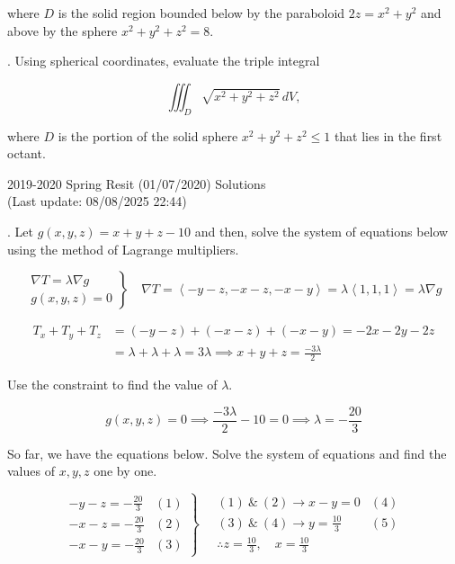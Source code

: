 \documentclass{article}
\begin{document}
\hfill

\noindent where $D$ is the solid region bounded below by the paraboloid $2z=x^2+y^2$ and above by the sphere $x^2+y^2+z^2=8$.

\hfill

. Using spherical coordinates, evaluate the triple integral

\[\iiint_D\sqrt{x^2+y^2+z^2}\,dV,\]

\hfill

\noindent where $D$ is the portion of the solid sphere $x^2+y^2+z^2\leq1$ that lies in the first octant.

\newpage

\begin{center}
2019-2020 Spring Resit (01/07/2020) Solutions\\
(Last update: 08/08/2025 22:44)
\end{center}

. Let $g(x,y,z)=x+y+z-10$ and then, solve the system of equations below using the method of Lagrange multipliers.

\[
\left.
\begin{array}{ll}
\displaystyle\nabla T =\lambda \nabla g\\
\displaystyle g(x,y,z) = 0
\end{array}
\right\}\quad
\nabla T = \left\langle-y-z,-x-z,-x-y\right\rangle=\lambda\left\langle1,1,1\right\rangle= \lambda\nabla g
\]

\begin{align*}T_x+T_y + T_z&=(-y-z) +(-x-z) +(-x-y)=-2x-2y-2z\\&=\lambda+\lambda+\lambda=3\lambda\implies x+y+z=\frac{-3\lambda}{2}\end{align*}

\hfill

\noindent Use the constraint to find the value of $\lambda$.

\[g(x,y,z) = 0 \implies \frac{-3\lambda}{2}-10=0\implies \lambda=-\frac{20}{3}\]

\hfill

\noindent So far, we have the equations below. Solve the system of equations and find the values of $x,y,z$ one by one.

\[
\left.
\begin{array}{ll}
\displaystyle -y-z=-\frac{20}{3}&(1)\\[0.5cm]
\displaystyle -x-z=-\frac{20}{3}&(2)\\[0.5cm]
\displaystyle -x-y=-\frac{20}{3}&(3)
\end{array}
\right\}\quad
\begin{array}{ll}
\displaystyle (1)\:\&\:(2)\rightarrow x-y=0 & (4) \\[0.2cm]
\displaystyle (3)\:\&\:(4)\rightarrow y=\frac{10}{3}&(5)\\[0.5cm]
\displaystyle\therefore z=\frac{10}{3},\quad x=\frac{10}{3}
\end{array}
\]
\end{document}
